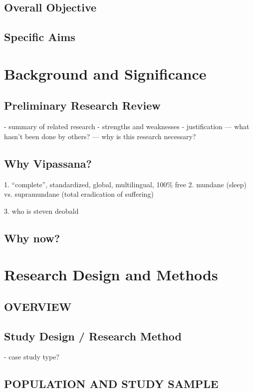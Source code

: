 \documentclass[a4paper, amsfonts, amssymb, amsmath, reprint, showkeys, nofootinbib, twoside]{revtex4-1}
\begin{document}
\subsection{Overall Objective}
\subsection{Specific Aims}

\section{Background and Significance}

\subsection{Preliminary Research Review}
- summary of related research
- strengths and weaknesses
- justification
--- what hasn't been done by others?
--- why is this research necessary?

\subsection{Why Vipassana?}

1. ``complete'', standardized, global, multilingual, 100\% free
2. mundane (sleep) vs. supramundane (total eradication of suffering)



3. who is steven deobald

\subsection{Why now?}

\section{Research Design and Methods}
\subsection{OVERVIEW}

\subsection{Study Design / Research Method}
- case study type?

\subsection{POPULATION AND STUDY SAMPLE}
\end{document}
